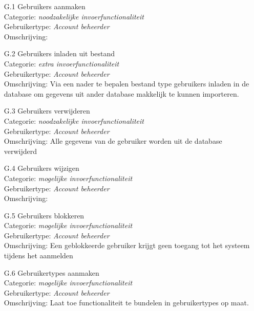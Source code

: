 \documentclass{article}
\begin{document}
\begin{itemize}
\item[G.1] Gebruikers aanmaken \\
Categorie: \textit{noodzakelijke invoerfunctionaliteit} \\
Gebruikertype: \textit{Account beheerder} \\
Omschrijving: \\[-3mm]

\item[G.2] Gebruikers inladen uit bestand \\
Categorie: \textit{extra invoerfunctionaliteit} \\
Gebruikertype: \textit{Account beheerder} \\
Omschrijving: Via een nader te bepalen bestand type gebruikers inladen in de database om gegevens uit ander database makkelijk te kunnen importeren. \\[-3mm]

\item[G.3] Gebruikers verwijderen \\
Categorie: \textit{noodzakelijke invoerfunctionaliteit} \\
Gebruikertype: \textit{Account beheerder} \\
Omschrijving: Alle gegevens van de gebruiker worden uit de database verwijderd \\[-3mm]

\item[G.4] Gebruikers wijzigen \\
Categorie: \textit{mogelijke invoerfunctionaliteit} \\
Gebruikertype: \textit{Account beheerder} \\
Omschrijving: \\[-3mm]

\item[G.5] Gebruikers blokkeren \\
Categorie: \textit{mogelijke  invoerfunctionaliteit} \\
Gebruikertype: \textit{Account beheerder}\\
Omschrijving: Een geblokkeerde gebruiker krijgt geen toegang tot het systeem tijdens het aanmelden \\[-3mm]

\item[G.6] Gebruikertypes aanmaken \\
Categorie: \textit{mogelijke invoerfunctionaliteit} \\
Gebruikertype: \textit{Account beheerder} \\
Omschrijving: Laat toe functionaliteit te bundelen in gebruikertypes op maat.\\[-3mm]


\end{itemize}
\end{document}

